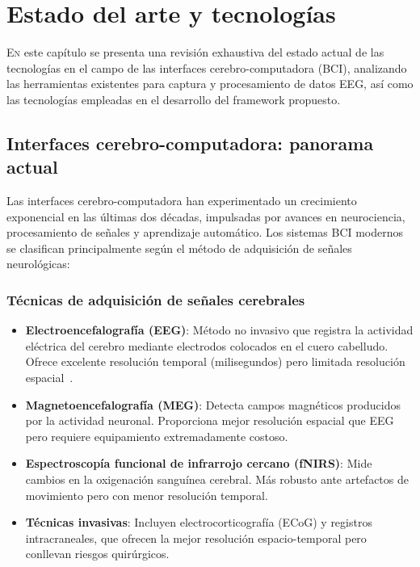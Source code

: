 \chapter{Estado del arte y tecnologías}
\label{chap:estado_arte}

\lettrine{E}{n} este capítulo se presenta una revisión exhaustiva del estado actual de las tecnologías en el campo de las interfaces cerebro-computadora (BCI), analizando las herramientas existentes para captura y procesamiento de datos EEG, así como las tecnologías empleadas en el desarrollo del framework propuesto.

\section{Interfaces cerebro-computadora: panorama actual}
\label{sec:bci_panorama}

Las interfaces cerebro-computadora han experimentado un crecimiento exponencial en las últimas dos décadas, impulsadas por avances en neurociencia, procesamiento de señales y aprendizaje automático. Los sistemas BCI modernos se clasifican principalmente según el método de adquisición de señales neurológicas:

\subsection{Técnicas de adquisición de señales cerebrales}
\label{subsec:tecnicas_adquisicion}

\begin{itemize}
    \item \textbf{Electroencefalografía (EEG)}: Método no invasivo que registra la actividad eléctrica del cerebro mediante electrodos colocados en el cuero cabelludo. Ofrece excelente resolución temporal (milisegundos) pero limitada resolución espacial~\cite{eeg_bci_review}.

    \item \textbf{Magnetoencefalografía (MEG)}: Detecta campos magnéticos producidos por la actividad neuronal. Proporciona mejor resolución espacial que EEG pero requiere equipamiento extremadamente costoso.

    \item \textbf{Espectroscopía funcional de infrarrojo cercano (fNIRS)}: Mide cambios en la oxigenación sanguínea cerebral. Más robusto ante artefactos de movimiento pero con menor resolución temporal.

    \item \textbf{Técnicas invasivas}: Incluyen electrocorticografía (ECoG) y registros intracraneales, que ofrecen la mejor resolución espacio-temporal pero conllevan riesgos quirúrgicos.
\end{itemize}

